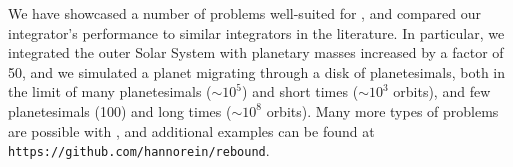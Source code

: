 We have showcased a number of problems well-suited for \hermes, and compared our integrator's performance to similar integrators in the literature. 
In particular, we integrated the outer Solar System with planetary masses increased by a factor of 50, and we simulated a planet migrating through a disk of planetesimals, both in the limit of many planetesimals ($\sim 10^5$) and short times ($\sim 10^3$ orbits), and few planetesimals (100) and long times ($\sim 10^8$ orbits).
Many more types of problems are possible with \hermes, and additional examples can be found at {\sc \tt https://github.com/hannorein/rebound}.
